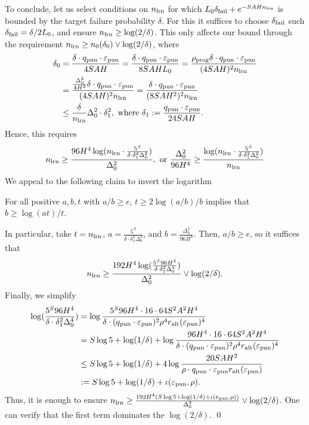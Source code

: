 	\newcommand{\deltapun}{\delta_{\mathrm{pun}}}
	To conclude, let us select conditions on $n_{\mathrm{lrn}}$ for which $L_0 \delta_{\mathrm{fail}}  + e^{- SAH n_{\mathrm{lrn}}}$ is bounded by the target failure probability $\delta$. For this it suffices to choose $\delta_{\mathrm{fail}}$ such $\delta_{\mathrm{fail}} = \delta/2L_0$, and ensure $n_{\mathrm{lrn}} \ge \log(2/\delta)$. This only affects our bound through the requirement $n_{\mathrm{lrn}} \ge n_0(\delta_0) \vee \log(2/\delta)$, where
	\begin{align*}
	\delta_0 &= \frac{\delta \cdot q_{\mathrm{pun}} \cdot \varepsilon_{\mathrm{pun}}}{4SAH} = \frac{\delta\cdot q_{\mathrm{pun}} \cdot \varepsilon_{\mathrm{pun}}}{8SAHL_0} = \frac{\rho_{\mathrm{prog}}\delta \cdot q_{\mathrm{pun}} \cdot \varepsilon_{\mathrm{pun}}}{(4SAH)^2n_{\mathrm{lrn}}}\\
	&= \frac{\frac{\Delta_0^2}{4H^2}\delta \cdot q_{\mathrm{pun}} \cdot \varepsilon_{\mathrm{pun}}}{(4SAH)^2n_{\mathrm{lrn}}}=  \frac{\delta \cdot q_{\mathrm{pun}} \cdot \varepsilon_{\mathrm{pun}}}{(8SAH^2)^2n_{\mathrm{lrn}}}\\
	&\le \frac{\delta}{n_{\mathrm{lrn}}} \Delta_0^2 \cdot \delta_1^2, \text{ where } \delta_1 := \frac{q_{\mathrm{pun}} \cdot \varepsilon_{\mathrm{pun}}}{24SAH}.
	\end{align*}
	 Hence, this requires
	\begin{align*}
	n_{\mathrm{lrn}} \ge \frac{96 H^4 \log(n_{\mathrm{lrn}} \cdot \frac{5^S}{\delta \cdot \delta_1^2 \Delta_0^2})}{\Delta_0^2}, \text{ or } \frac{\Delta_0^2}{96 H^4} \ge  \frac{\log(n_{\mathrm{lrn}} \cdot \frac{5^S}{\delta \cdot \delta_1^2 \Delta_0^2})}{n_{\mathrm{lrn}}}
	\end{align*}
	We appeal to the following claim to invert the logarithm
	\begin{claim} For all positive $a,b,t$ with $a/b \ge e$, $t \ge 2 \log(a/b)/b$ implies that $b \ge \log(a t)/t$.
	\end{claim}
	In particular, take $t = n_{\mathrm{lrn}}$, $a = \frac{5^S}{\delta \cdot \delta_1^2 \Delta_0^2}$, and $b = \frac{\Delta_0^2}{96 H^4}$. Then, $a/b \ge e$, so it suffices that
	\begin{align*}
	n_{\mathrm{lrn}} \ge \frac{192 H^4 \log(\frac{5^S 96 H^4}{\delta \cdot \delta_1^2 \Delta_0^4 })}{\Delta_0^2} \vee \log(2/\delta).
	\end{align*}
	Finally, we simplify
	\begin{align*}
	\log(\frac{5^S 96 H^4}{\delta \cdot \delta_1^2 \Delta_0^4 })  &= \log \frac{5^S 96 H^4 \cdot 16 \cdot 64 S^2A^2H^4  }{\delta \cdot (q_{\mathrm{pun}} \cdot \varepsilon_{\mathrm{pun}})^2 \rho^4 r_{\mathrm{alt}}(\varepsilon_{\mathrm{pun}})^4 }\\
	&= S\log 5 + \log(1/\delta) +  \log \frac{96 H^4 \cdot 16 \cdot 64 S^2A^2H^4  }{\delta \cdot (q_{\mathrm{pun}} \cdot \varepsilon_{\mathrm{pun}})^2 \rho^4 r_{\mathrm{alt}}(\varepsilon_{\mathrm{pun}})^4 }\\
	&\le S\log 5 + \log(1/\delta) +  4\log \frac{20 SAH^2 }{\rho \cdot q_{\mathrm{pun}} \cdot \varepsilon_{\mathrm{pun}}  r_{\mathrm{alt}}(\varepsilon_{\mathrm{pun}}) }\\
	&:= S\log 5 + \log(1/\delta) +  \iota(\varepsilon_{\mathrm{pun}},\rho).
	\end{align*}
	Thus, it is enough to ensure $n_{\mathrm{lrn}} \ge \frac{192 H^4 (S\log 5 + \log(1/\delta) +  \iota(\varepsilon_{\mathrm{pun}},\rho))}{\Delta_0^2} \vee \log(2/\delta)$. One can verify that the first term dominates the $\log(2/\delta)$.
	\qed
